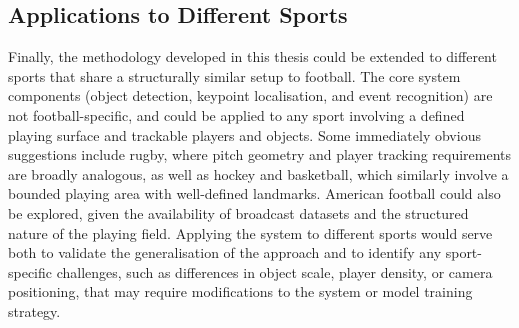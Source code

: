 \subsection{Applications to Different Sports}
Finally, the methodology developed in this thesis could be extended to different sports that share a structurally similar setup to football. The core system components (object detection, keypoint localisation, and event recognition) are not football-specific, and could be applied to any sport involving a defined playing surface and trackable players and objects. Some immediately obvious suggestions include rugby, where pitch geometry and player tracking requirements are broadly analogous, as well as hockey and basketball, which similarly involve a bounded playing area with well-defined landmarks. American football could also be explored, given the availability of broadcast datasets and the structured nature of the playing field. Applying the system to different sports would serve both to validate the generalisation of the approach and to identify any sport-specific challenges, such as differences in object scale, player density, or camera positioning, that may require modifications to the system or model training strategy.

